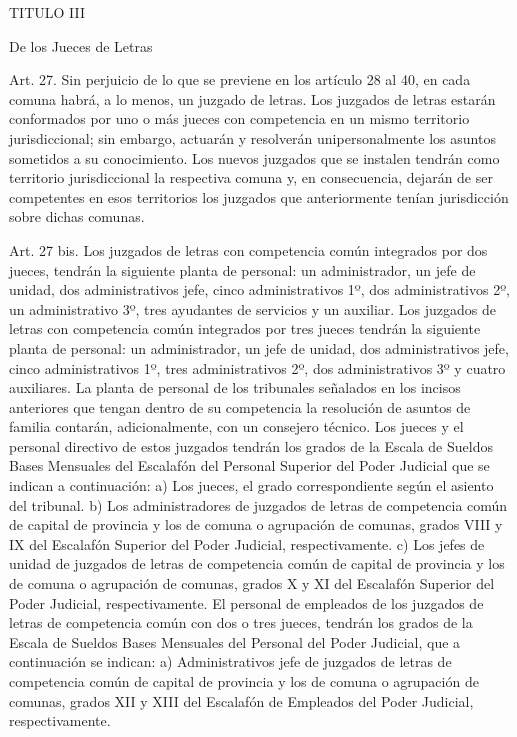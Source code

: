     TITULO III

    De los Jueces de Letras

    Art. 27. Sin perjuicio de lo que se previene en los artículo 28 al 40, en cada comuna habrá, a lo menos, un juzgado de letras.
    Los juzgados de letras estarán conformados por uno o más jueces con competencia en un mismo territorio jurisdiccional; sin embargo, actuarán y resolverán unipersonalmente los asuntos sometidos a su conocimiento.
    Los nuevos juzgados que se instalen tendrán como territorio jurisdiccional la respectiva comuna y, en consecuencia, dejarán de ser competentes en esos territorios los juzgados que anteriormente tenían jurisdicción sobre dichas comunas.

    Art. 27 bis. Los juzgados de letras con competencia común integrados por dos jueces, tendrán la siguiente planta de personal: un administrador, un jefe de unidad, dos administrativos jefe, cinco administrativos 1º, dos administrativos 2º, un administrativo 3º, tres ayudantes de servicios y un auxiliar.
    Los juzgados de letras con competencia común integrados por tres jueces tendrán la siguiente planta de personal: un administrador, un jefe de unidad, dos administrativos jefe, cinco administrativos 1º, tres administrativos 2º, dos administrativos 3º y cuatro auxiliares.
    La planta de personal de los tribunales señalados en los incisos anteriores que tengan dentro de su competencia la resolución de asuntos de familia contarán, adicionalmente, con un consejero técnico.
    Los jueces y el personal directivo de estos juzgados tendrán los grados de la Escala de Sueldos Bases Mensuales del Escalafón del Personal Superior del Poder Judicial que se indican a continuación:
    a) Los jueces, el grado correspondiente según el asiento del tribunal.
    b) Los administradores de juzgados de letras de competencia común de capital de provincia y los de comuna o agrupación de comunas, grados VIII y IX del Escalafón Superior del Poder Judicial, respectivamente.
    c) Los jefes de unidad de juzgados de letras de competencia común de capital de provincia y los de comuna o agrupación de comunas, grados X y XI del Escalafón Superior del Poder Judicial, respectivamente.
    El personal de empleados de los juzgados de letras de competencia común con dos o tres jueces, tendrán los grados de la Escala de Sueldos Bases Mensuales del Personal del Poder Judicial, que a continuación se indican:
    a) Administrativos jefe de juzgados de letras de competencia común de capital de provincia y los de comuna o agrupación de comunas, grados XII y XIII del Escalafón de Empleados del Poder Judicial, respectivamente.

